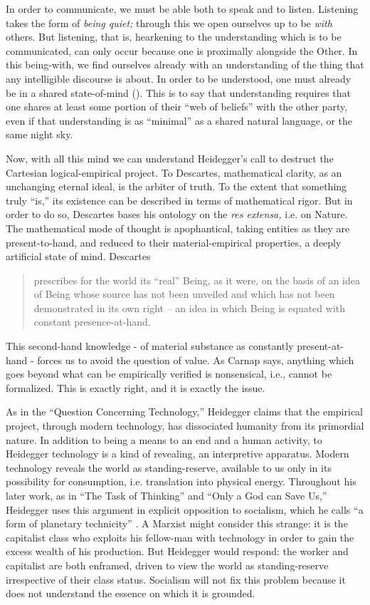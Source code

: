 \documentclass[leqno, 12pt]{turabian-researchpaper}
\begin{document}
	In order to communicate, we must be able both to speak and to listen.
	Listening takes the form of \emph{being quiet;} through this we open ourselves
	up to be \emph{with} others. But listening, that is, hearkening to the understanding
	which is to be communicated, can only occur because one is proximally
	alongside the Other. In this being-with, we find ourselves already with an
	understanding of the thing that any intelligible discourse is about. In order to
	be understood, one must already be in a shared state-of-mind ().
	This is to say that understanding requires that one shares at least some portion
	of their \enquote{web of beliefs} with the other party, even if that understanding
	is as \enquote{minimal} as a shared natural language, or the same night sky.

	Now, with all this mind we can understand Heidegger's call to destruct the
	Cartesian logical-empirical project. To Descartes, mathematical clarity, as an
	unchanging eternal ideal, is the arbiter of truth. To the extent that something
	truly \enquote{is,} its existence can be described in terms of mathematical
	rigor. But in order to do so, Descartes bases his ontology on the \textit{res
	extensa,} i.e. on Nature. The mathematical mode of thought is apophantical,
	taking entities as they are present-to-hand, and reduced to their material-empirical
	properties, a deeply artificial state of mind. Descartes \blockquote[{}]{prescribes for the world its \enquote{real} Being, as it were, on the basis of an idea of Being whose source has not been unveiled and which has not been demonstrated in its own right -- an idea in which Being is equated with constant presence-at-hand.}
	This second-hand knowledge - of material substance as constantly present-at-hand
	- forces us to avoid the question of value. As Carnap says, anything which goes
	beyond what can be empirically verified is nonsensical, i.e., cannot be
	formalized. This is exactly right, and it is exactly the issue.

	As in the \enquote{Question Concerning Technology,} \nocite{heidegger2008c}
	Heidegger claims that the empirical project, through modern technology, has
	dissociated humanity from its primordial nature. In addition to being a means to
	an end and a human activity, to Heidegger technology is a kind of revealing, an
	interpretive apparatus. Modern technology reveals the world as standing-reserve,
	available to us only in its possibility for consumption, i.e. translation into
	physical energy. Throughout his later work, as in \enquote{The Task of Thinking}\nocite{heidegger2008d}
	and \enquote{Only a God can Save Us,} Heidegger uses this argument in explicit
	opposition to socialism, which he calls \enquote{a form of planetary technicity}
	\autocite[p206]{heidegger1981}. A Marxist might consider this strange: it is the
	capitalist class who exploits his fellow-man with technology in order to gain the
	excess wealth of his production. But Heidegger would respond: the worker and capitalist
	are both enframed, driven to view the world as standing-reserve irrespective
	of their class status. Socialism will not fix this problem because it does not
	understand the essence on which it is grounded.
\end{document}
